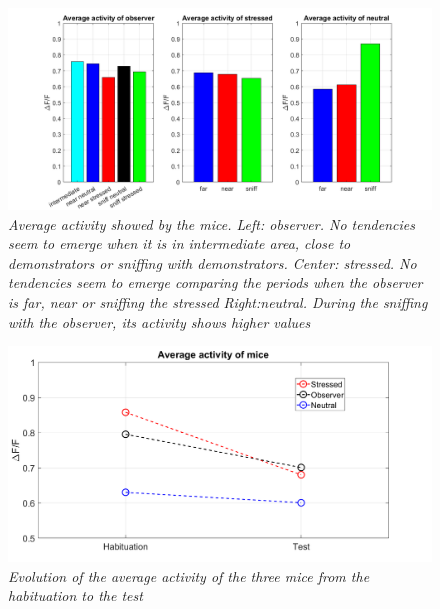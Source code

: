 \documentclass[a4paper]{article}
\begin{document}
	
		\begin{figure}[H]
		
		\begin{center}
			\hspace*{-1.6cm}
			\includegraphics[scale=.42]{activity_barplot.png} 
		\end{center} 
		\caption{\textit{Average activity showed by the mice. Left: observer. No tendencies seem to emerge when it is in intermediate area, close to demonstrators or sniffing with demonstrators. Center: stressed. No tendencies seem to emerge comparing the periods when the observer is far, near or sniffing the stressed Right:neutral. During the sniffing with the observer, its activity shows higher values}}
		
	\end{figure}


\begin{figure}[H]
	
	\begin{center}
	
		\includegraphics[scale=.4]{activities.png} 
	\end{center} 
	\caption{\textit{Evolution of the average activity of the three mice from the habituation to the test}}
	
\end{figure}
\end{document}
